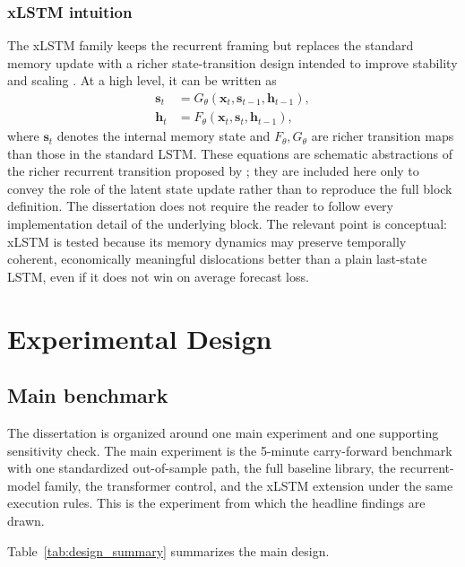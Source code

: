 \documentclass[12pt]{report}
\newcommand{\code}[1]{\begingroup\ttfamily\path{#1}\endgroup}
\begin{document}
\subsection{xLSTM intuition}
The xLSTM family keeps the recurrent framing but replaces the standard memory update with a richer state-transition design intended to improve stability and scaling \citep{beck2024xlstm}. At a high level, it can be written as
\begin{align}
\mathbf{s}_t &= G_\theta(\mathbf{x}_t, \mathbf{s}_{t-1}, \mathbf{h}_{t-1}), \\
\mathbf{h}_t &= F_\theta(\mathbf{x}_t, \mathbf{s}_t, \mathbf{h}_{t-1}),
\end{align}
where \(\mathbf{s}_t\) denotes the internal memory state and \(F_\theta, G_\theta\) are richer transition maps than those in the standard LSTM. These equations are schematic abstractions of the richer recurrent transition proposed by \citet{beck2024xlstm}; they are included here only to convey the role of the latent state update rather than to reproduce the full block definition. The dissertation does not require the reader to follow every implementation detail of the underlying \code{mLSTM} block. The relevant point is conceptual: xLSTM is tested because its memory dynamics may preserve temporally coherent, economically meaningful dislocations better than a plain last-state LSTM, even if it does not win on average forecast loss.

\chapter{Experimental Design}

\section{Main benchmark}
The dissertation is organized around one main experiment and one supporting sensitivity check. The main experiment is the 5-minute carry-forward benchmark with one standardized out-of-sample path, the full baseline library, the recurrent-model family, the transformer control, and the xLSTM extension under the same execution rules. This is the experiment from which the headline findings are drawn.

Table~\ref{tab:design_summary} summarizes the main design.
\end{document}
